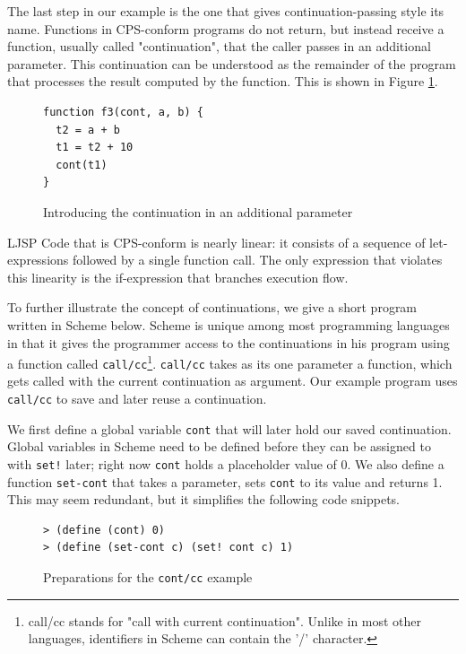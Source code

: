 \documentclass[11pt]{report}
\begin{document}
The last step in our example is the one that gives continuation-passing style its name. Functions in CPS-conform programs do not return, but instead receive a function, usually called "continuation", that the caller passes in an additional parameter. This continuation can be understood as the remainder of the program that processes the result computed by the function. This is shown in Figure \ref{cpsconvfunc4}.

\begin{figure}[ht]
\begin{lstlisting}
function f3(cont, a, b) {
  t2 = a + b
  t1 = t2 + 10
  cont(t1)
}
\end{lstlisting}
\caption{Introducing the continuation in an additional parameter}
\label{cpsconvfunc4}
\end{figure}

LJSP Code that is CPS-conform is nearly linear: it consists of a sequence of let-expressions followed by a single function call. The only expression that violates this linearity is the if-expression that branches execution flow.

To further illustrate the concept of continuations, we give a short program written in Scheme below. Scheme is unique among most programming languages in that it gives the programmer access to the continuations in his program using a function called \texttt{call/cc}\footnote{call/cc stands for "call with current continuation". Unlike in most other languages, identifiers in Scheme can contain the '/' character.}. \texttt{call/cc} takes as its one parameter a function, which gets called with the current continuation as argument. Our example program uses \texttt{call/cc} to save and later reuse a continuation.

We first define a global variable \texttt{cont} that will later hold our saved continuation. Global variables in Scheme need to be defined before they can be assigned to with \texttt{set!} later; right now \texttt{cont} holds a placeholder value of 0. We also define a function \texttt{set-cont} that takes a parameter, sets \texttt{cont} to its value and returns 1. This may seem redundant, but it simplifies the following code snippets.
\begin{figure}[ht]
\begin{lstlisting}
> (define (cont) 0)
> (define (set-cont c) (set! cont c) 1)
\end{lstlisting}
\caption{Preparations for the \texttt{cont/cc} example}
\label{contcc1}
\end{figure}
\end{document}
